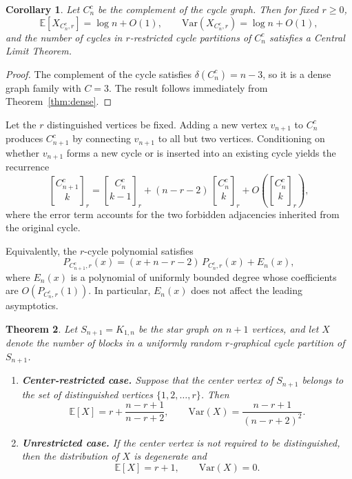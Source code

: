 \documentclass{amsart}
\newtheorem{theorem}{Theorem}[section]
\newtheorem{corollary}[theorem]{Corollary}
\theoremstyle{definition}
\begin{document}
\begin{corollary}
Let $C_n^c$ be the complement of the cycle graph. Then for fixed $r\ge0$,
\[
\mathbb{E}[X_{C_n^c,r}] = \log n + O(1),
\qquad
\mathrm{Var}(X_{C_n^c,r}) = \log n + O(1),
\]
and the number of cycles in $r$-restricted cycle partitions of $C_n^c$ satisfies
a Central Limit Theorem.
\end{corollary}

\begin{proof}
The complement of the cycle satisfies $\delta(C_n^c)=n-3$, so it is a dense graph
family with $C=3$. The result follows immediately from
Theorem~\ref{thm:dense}.
\end{proof}


Let the $r$ distinguished vertices be fixed. Adding a new vertex $v_{n+1}$ to
$C_n^c$ produces $C_{n+1}^c$ by connecting $v_{n+1}$ to all but two vertices.
Conditioning on whether $v_{n+1}$ forms a new cycle or is inserted into an
existing cycle yields the recurrence
\[
{C_{n+1}^c \brack k}_r
=
{C_n^c \brack k-1}_r
+
(n-r-2)\,{C_n^c \brack k}_r
+
O\!\left({C_n^c \brack k}_r\right),
\]
where the error term accounts for the two forbidden adjacencies inherited from
the original cycle.

Equivalently, the $r$-cycle polynomial satisfies
\[
P_{C_{n+1}^c,r}(x)
=
(x+n-r-2)\,P_{C_n^c,r}(x)
+
E_n(x),
\]
where $E_n(x)$ is a polynomial of uniformly bounded degree whose coefficients
are $O(P_{C_n^c,r}(1))$. In particular, $E_n(x)$ does not affect the leading
asymptotics.



\begin{theorem}
\label{thm:star-moments}
Let $S_{n+1}=K_{1,n}$ be the star graph on $n+1$ vertices, and let
$X$ denote the number of blocks in a uniformly random
$r$-graphical cycle partition of $S_{n+1}$.

\begin{enumerate}
\item[(i)] \textbf{Center-restricted case.}
Suppose that the center vertex of $S_{n+1}$ belongs to the set of
distinguished vertices $\{1,2,\dots,r\}$. Then
\[
\mathbb{E}[X]
=
r+\frac{n-r+1}{n-r+2},
\qquad
\mathrm{Var}(X)
=
\frac{n-r+1}{(n-r+2)^2}.
\]

\item[(ii)] \textbf{Unrestricted case.}
If the center vertex is not required to be distinguished, then the
distribution of $X$ is degenerate and
\[
\mathbb{E}[X]=r+1,
\qquad
\mathrm{Var}(X)=0.
\]
\end{enumerate}
\end{theorem}
\end{document}
